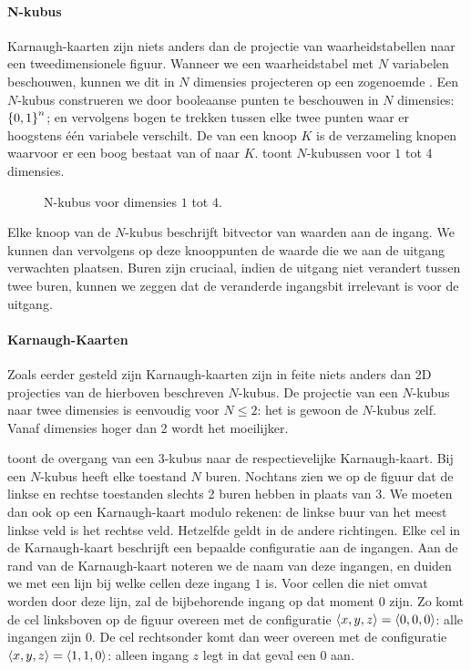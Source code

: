 \paragraph{N-kubus}
Karnaugh-kaarten zijn niets anders dan de projectie van waarheidstabellen naar een tweedimensionele figuur. Wanneer we een waarheidstabel met $N$ variabelen beschouwen, kunnen we dit in $N$ dimensies projecteren op een zogenoemde . Een $N$-kubus construeren we door booleaanse punten te beschouwen in $N$ dimensies: $\left\{ 0,1 \right\}^n$; en vervolgens bogen te trekken tussen elke twee punten waar er hoogstens \'e\'en variabele verschilt. De  van een knoop $K$ is de verzameling knopen waarvoor er een boog bestaat van of naar $K$.  toont $N$-kubussen voor $1$ tot $4$ dimensies.

\begin{figure}[htb]
\centering
{}
\caption{N-kubus voor dimensies $1$ tot $4$.}
\end{figure}

Elke knoop van de $N$-kubus beschrijft bitvector van waarden aan de ingang. We kunnen dan vervolgens op deze knooppunten de waarde die we aan de uitgang verwachten plaatsen. Buren zijn cruciaal, indien de uitgang niet verandert tussen twee buren, kunnen we zeggen dat de veranderde ingangsbit irrelevant is voor de uitgang.

\paragraph{Karnaugh-Kaarten}
Zoals eerder gesteld zijn Karnaugh-kaarten zijn in feite niets anders dan 2D projecties van de hierboven beschreven $N$-kubus. De projectie van een $N$-kubus naar twee dimensies is eenvoudig voor $N\leq 2$: het is gewoon de $N$-kubus zelf. Vanaf dimensies hoger dan 2 wordt het moeilijker.


 toont de overgang van een $3$-kubus naar de respectievelijke Karnaugh-kaart. Bij een $N$-kubus heeft elke toestand $N$ buren. Nochtans zien we op de figuur dat de linkse en rechtse toestanden slechts 2 buren hebben in plaats van 3. We moeten dan ook op een Karnaugh-kaart modulo rekenen: de linkse buur van het meest linkse veld is het rechtse veld. Hetzelfde geldt in de andere richtingen. Elke cel in de Karnaugh-kaart beschrijft een bepaalde configuratie aan de ingangen. Aan de rand van de Karnaugh-kaart noteren we de naam van deze ingangen, en duiden we met een lijn bij welke cellen deze ingang $1$ is. Voor cellen die niet omvat worden door deze lijn, zal de bijbehorende ingang op dat moment $0$ zijn. Zo komt de cel linksboven op de figuur overeen met de configuratie $\left\langle x,y,z \right\rangle=\left\langle 0,0,0 \right\rangle$: alle ingangen zijn $0$. De cel rechtsonder komt dan weer overeen met de configuratie $\left\langle x,y,z \right\rangle=\left\langle 1,1,0 \right\rangle$: alleen ingang $z$ legt in dat geval een $0$ aan.


